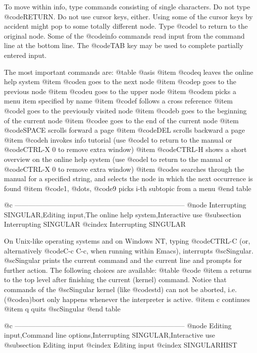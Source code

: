 To move within info, type commands consisting of single characters.  Do
not type @code{RETURN}.  Do not use cursor keys, either.  Using some of
the cursor keys by accident might pop to some totally different node.
Type @code{l} to return to the original node.  Some of the @code{info}
commands read input from the command line at the bottom line.  The
@code{TAB} key may be used to complete partially entered input.

The most important commands are:
@table @asis
@item @code{q}
leaves the online help system
@item @code{n}
goes to the next node
@item @code{p}
goes to the previous node
@item @code{u}
goes to the upper node
@item @code{m}
picks a menu item specified by name
@item @code{f}
follows a cross reference
@item @code{l}
goes to the previously visited node
@item @code{b}
goes to the beginning of the current node
@item @code{e}
goes to the end of the current node
@item @code{SPACE}
scrolls forward a page
@item @code{DEL}
scrolls backward a page
@item @code{h}
invokes info tutorial (use @code{l} to return to the manual or
@code{CTRL-X 0} to remove extra window)
@item @code{CTRL-H}
shows a short overview on the online help system (use @code{l} to return
to the manual or @code{CTRL-X 0} to remove extra window)
@item @code{s}
searches through the manual for a specified string, and selects the node in
which the next occurrence is found
@item @code{1}, @dots{}, @code{9}
picks i-th subtopic from a menu
@end table

@c --------------------------------------------------------------------------
@node Interrupting SINGULAR,Editing input,The online help system,Interactive use
@subsection Interrupting SINGULAR
@cindex Interrupting SINGULAR

On Unix-like operating systems and on Windows NT, typing @code{CTRL-C}
(or, alternatively @code{C-c C-c}, when running within Emacs),
interrupts @sc{Singular}.  @sc{Singular} prints the current command and
the current line and prompts for further action.  The following choices
are available:
@table @code
@item a
returns to the top level after finishing the current (kernel) command. Notice
that commands of the @sc{Singular} kernel (like @code{std}) can not be
aborted, i.e. (@code{a})bort only happens whenever the interpreter is active.
@item c
continues
@item q
quits  @sc{Singular}
@end table

@c --------------------------------------------------------------------------
@node Editing input,Command line options,Interrupting SINGULAR,Interactive use
@subsection Editing input
@cindex Editing input
@cindex SINGULARHIST

